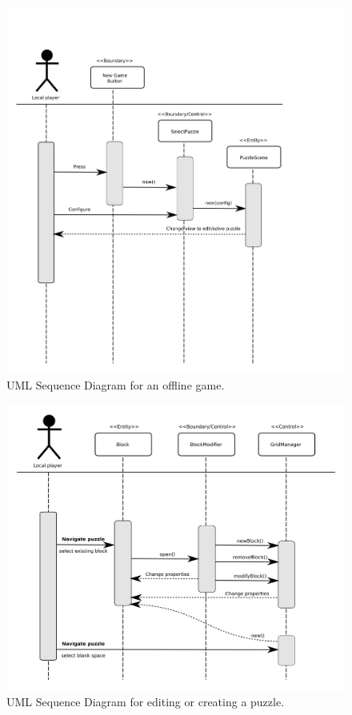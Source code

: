 \documentclass[12pt]{article}
\begin{document}
    \begin{figure}[H]
        \centering
        \includegraphics[width=6in]{sequence_offline_play.png}
        \caption{UML Sequence Diagram for an offline game.}
    \end{figure}


    \begin{figure}[H]
        \centering
        \includegraphics[width=6in]{sequence_edit.png}
        \caption{UML Sequence Diagram for editing or creating a puzzle.}
    \end{figure}
\end{document}
